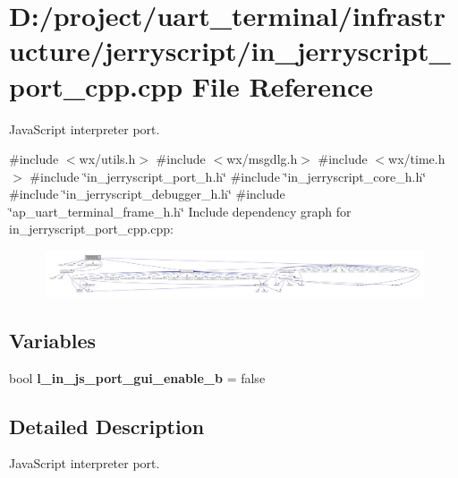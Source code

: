 \section{D\+:/project/uart\+\_\+terminal/infrastructure/jerryscript/in\+\_\+jerryscript\+\_\+port\+\_\+cpp.cpp File Reference}
\label{in__jerryscript__port__cpp_8cpp}


Java\+Script interpreter port.  


{\ttfamily \#include $<$wx/utils.\+h$>$}\newline
{\ttfamily \#include $<$wx/msgdlg.\+h$>$}\newline
{\ttfamily \#include $<$wx/time.\+h$>$}\newline
{\ttfamily \#include \char`\"{}in\+\_\+jerryscript\+\_\+port\+\_\+h.\+h\char`\"{}}\newline
{\ttfamily \#include \char`\"{}in\+\_\+jerryscript\+\_\+core\+\_\+h.\+h\char`\"{}}\newline
{\ttfamily \#include \char`\"{}in\+\_\+jerryscript\+\_\+debugger\+\_\+h.\+h\char`\"{}}\newline
{\ttfamily \#include \char`\"{}ap\+\_\+uart\+\_\+terminal\+\_\+frame\+\_\+h.\+h\char`\"{}}\newline
Include dependency graph for in\+\_\+jerryscript\+\_\+port\+\_\+cpp.\+cpp\+:\nopagebreak
\begin{figure}[H]
\begin{center}
\leavevmode
\includegraphics[width=350pt]{in__jerryscript__port__cpp_8cpp__incl}
\end{center}
\end{figure}
\subsection*{Variables}
\begin{DoxyCompactItemize}
\item 
bool \textbf{ l\+\_\+in\+\_\+js\+\_\+port\+\_\+gui\+\_\+enable\+\_\+b} = false
\end{DoxyCompactItemize}


\subsection{Detailed Description}
Java\+Script interpreter port. 

